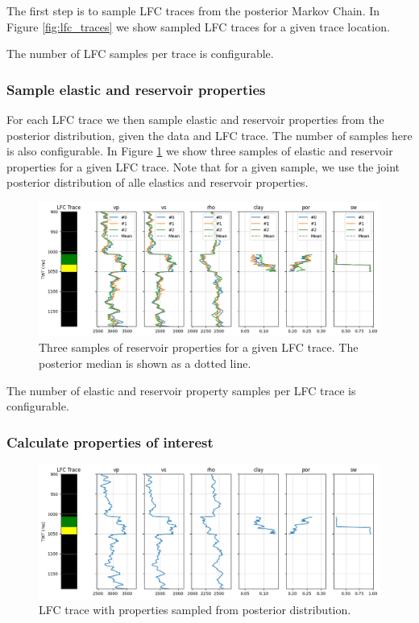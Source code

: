 \documentclass[note,screen,english,12pt,utf8]{nrdoc}
\begin{document}
The first step is to sample LFC traces from the posterior Markov Chain.
In Figure \ref{fig:lfc_traces} we show
sampled LFC traces for a given trace location.

The number of LFC samples per trace is configurable.

\subsubsection{Sample elastic and reservoir properties}
For each LFC trace we then sample elastic and reservoir properties
from the posterior distribution, given the data and LFC trace.
The number of samples here is also configurable. In Figure \ref{fig:sampled_properties}
we show three samples of elastic and reservoir properties for a given LFC trace. Note that
for a given sample, we use the joint posterior distribution of alle elastics
and reservoir properties.
\begin{figure}[h]
    \centering
    \includegraphics[width=\textwidth]{figures/sampled_properties_with_mean_il57_xl62.png}
    \caption{Three samples of reservoir properties for a given LFC trace. The posterior median is shown as a dotted line.}
    \label{fig:sampled_properties}
\end{figure}

The number of elastic and reservoir property samples per LFC trace is configurable.

\subsubsection{Calculate properties of interest}

\begin{figure}[h]
    \centering
    \includegraphics[width=\textwidth]{figures/sampled_properties_il57_xl62.png}
    \caption{LFC trace with properties sampled from posterior distribution.}
    \label{fig:lfc_trace_and_properties}
\end{figure}
\end{document}

